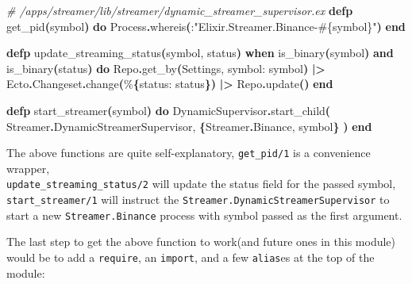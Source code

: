 \documentclass[
  oneside]{book}
\newenvironment{Shaded}{\begin{snugshade}}{\end{snugshade}}
\newcommand{\CommentTok}[1]{\textcolor[rgb]{0.56,0.35,0.01}{\textit{#1}}}
\newcommand{\ConstantTok}[1]{\textcolor[rgb]{0.56,0.35,0.01}{#1}}
\newcommand{\FunctionTok}[1]{\textcolor[rgb]{0.13,0.29,0.53}{\textbf{#1}}}
\newcommand{\KeywordTok}[1]{\textcolor[rgb]{0.13,0.29,0.53}{\textbf{#1}}}
\newcommand{\NormalTok}[1]{#1}
\newcommand{\OperatorTok}[1]{\textcolor[rgb]{0.81,0.36,0.00}{\textbf{#1}}}
\newcommand{\OtherTok}[1]{\textcolor[rgb]{0.56,0.35,0.01}{#1}}
\newcommand{\StringTok}[1]{\textcolor[rgb]{0.31,0.60,0.02}{#1}}
\newcommand{\VariableTok}[1]{\textcolor[rgb]{0.00,0.00,0.00}{#1}}
\begin{document}
\begin{Shaded}
\begin{Highlighting}[]
\CommentTok{\# /apps/streamer/lib/streamer/dynamic\_streamer\_supervisor.ex}
  \KeywordTok{defp}\NormalTok{ get\_pid}\FunctionTok{(}\NormalTok{symbol}\FunctionTok{)} \KeywordTok{do}
    \ConstantTok{Process}\OperatorTok{.}\NormalTok{whereis}\FunctionTok{(}\NormalTok{:}\StringTok{"Elixir.Streamer.Binance{-}}\OtherTok{\#\{}\NormalTok{symbol}\OtherTok{\}}\StringTok{"}\FunctionTok{)}
  \KeywordTok{end}

  \KeywordTok{defp}\NormalTok{ update\_streaming\_status}\FunctionTok{(}\NormalTok{symbol, status}\FunctionTok{)}
       \KeywordTok{when}\NormalTok{ is\_binary}\FunctionTok{(}\NormalTok{symbol}\FunctionTok{)} \KeywordTok{and}\NormalTok{ is\_binary}\FunctionTok{(}\NormalTok{status}\FunctionTok{)} \KeywordTok{do}
    \ConstantTok{Repo}\OperatorTok{.}\NormalTok{get\_by}\FunctionTok{(}\ConstantTok{Settings}\NormalTok{, }\VariableTok{symbol:}\NormalTok{ symbol}\FunctionTok{)}
    \OperatorTok{|\textgreater{}} \ConstantTok{Ecto}\OperatorTok{.}\ConstantTok{Changeset}\OperatorTok{.}\NormalTok{change}\FunctionTok{(}\NormalTok{\%}\FunctionTok{\{}\VariableTok{status:}\NormalTok{ status}\FunctionTok{\})}
    \OperatorTok{|\textgreater{}} \ConstantTok{Repo}\OperatorTok{.}\NormalTok{update}\FunctionTok{()}
  \KeywordTok{end}

  \KeywordTok{defp}\NormalTok{ start\_streamer}\FunctionTok{(}\NormalTok{symbol}\FunctionTok{)} \KeywordTok{do}
    \ConstantTok{DynamicSupervisor}\OperatorTok{.}\NormalTok{start\_child}\FunctionTok{(}
      \ConstantTok{Streamer}\OperatorTok{.}\ConstantTok{DynamicStreamerSupervisor}\NormalTok{,}
      \FunctionTok{\{}\ConstantTok{Streamer}\OperatorTok{.}\ConstantTok{Binance}\NormalTok{, symbol}\FunctionTok{\}}
    \FunctionTok{)}
  \KeywordTok{end}
\end{Highlighting}
\end{Shaded}

The above functions are quite self-explanatory, \texttt{get\_pid/1} is a convenience wrapper,\\
\texttt{update\_streaming\_status/2} will update the status field for the passed symbol, \texttt{start\_streamer/1} will instruct the \texttt{Streamer.DynamicStreamerSupervisor} to start a new \texttt{Streamer.Binance} process with symbol passed as the first argument.

The last step to get the above function to work(and future ones in this module) would be to add a \texttt{require}, an \texttt{import}, and a few \texttt{alias}es at the top of the module:
\end{document}
